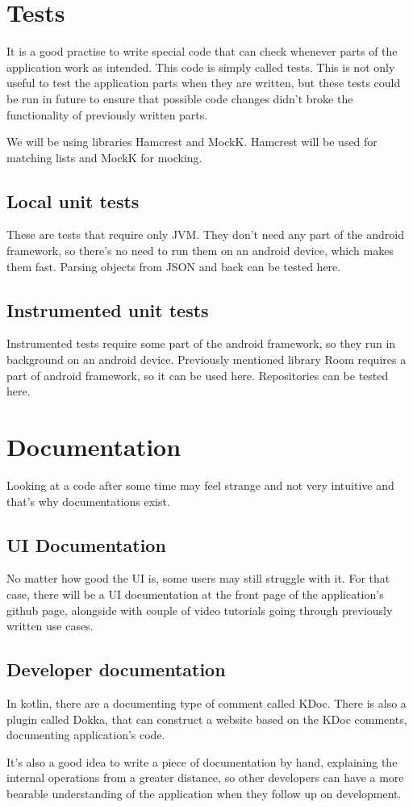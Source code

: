 \section{Tests}
It is a good practise to write special code that can check whenever parts of the application work as intended.
This code is simply called tests.
This is not only useful to test the application parts when they are written, but these tests could be run in future to ensure that possible code changes didn't broke the functionality of previously written parts.

We will be using libraries Hamcrest and MockK.
Hamcrest will be used for matching lists and MockK for mocking.

\subsection{Local unit tests}
These are tests that require only JVM.
They don't need any part of the android framework, so there's no need to run them on an android device, which makes them fast.
Parsing objects from JSON and back can be tested here.

\subsection{Instrumented unit tests}
Instrumented tests require some part of the android framework, so they run in background on an android device.
Previously mentioned library Room requires a part of android framework, so it can be used here.
Repositories can be tested here.

\section{Documentation}
Looking at a code after some time may feel strange and not very intuitive and that's why documentations exist.

\subsection{UI Documentation}
No matter how good the UI is, some users may still struggle with it.
For that case, there will be a UI documentation at the front page of the application's github page, alongside with couple of video tutorials going through previously written use cases.

\subsection{Developer documentation}
In kotlin, there are a documenting type of comment called KDoc.
There is also a plugin called Dokka, that can construct a website based on the KDoc comments, documenting application's code.

It's also a good idea to write a piece of documentation by hand, explaining the internal operations from a greater distance, so other developers can have a more bearable understanding of the application when they follow up on development.